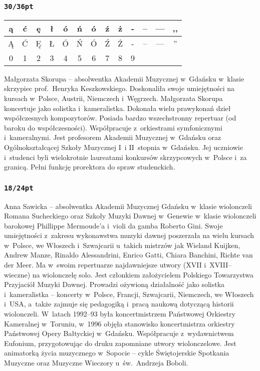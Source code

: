 \documentclass[twoside,a4page]{article}
\begin{document}
\subsubsection*{\tt 30/36pt}
\fontsize{30pt}{36pt}\selectfont

\begin{tabular}{|c|c|c|c|c|c|c|c|c|c|c|c|c|}\hline
ą & ć & ę & ł & ó & ń & ó & ź & ż & - &  -- &  --- &  ,, \\ \hline
Ą & Ć & Ę & Ł & Ó & Ń & Ó & Ź & Ż & - &  -- &  --- &  '' \\ \hline
0 & 1 & 2 & 3 & 4 & 5 & 6 & 7 & 8 & 9 &  & & \\ \hline
\end{tabular}

Małgorzata Skorupa – absolwentka Akademii Muzycznej w~Gdańsku w~klasie
skrzypiec prof.~Henryka Keszkowskiego. Doskonaliła swoje umiejętności
na kursach w~Polsce, Austrii, Niemczech i~Węgrzech. Małgorzata Skorupa
koncertuje jako solistka i~kameralistka. Dokonała wielu prawykonań
dzieł współczesnych kompozytorów. Posiada bardzo wszechstronny
repertuar (od baroku do współczesności). Współpracuje z~orkiestrami
symfonicznymi i~kameralnymi. Jest profesorem Akademii Muzycznej
w~Gdańsku oraz Ogólnokształcącej Szkoły Muzycznej I~i II~stopnia
w~Gdańsku. Jej uczniowie i~studenci byli wielokrotnie laureatami
konkursów skrzypcowych w~Polsce i~za granicą. Pełni funkcję prorektora
do spraw studenckich.

\subsubsection*{\tt 18/24pt}
\fontsize{24pt}{30pt}\selectfont

Anna Sawicka – absolwentka Akademii Muzycznej Gdańsku w~klasie
wiolonczeli Romana Sucheckiego oraz Szkoły Muzyki Dawnej w~Genewie
w~klasie wiolonczeli barokowej Phillippe Mermoude'a i~violi da gamba
Roberto Gini. Swoje umiejętności z~zakresu wykonawstwa muzyki dawnej
poszerzała na wielu kursach w~Polsce, we Włoszech i~Szwajcarii
u~takich mistrzów jak Wieland Kuijken, Andrew Manze, Rinaldo
Alessandrini, Enrico Gatti, Chiara Banchini, Richte van der Meer.
Ma w~swoim repertuarze najdawniejsze utwory (XVII i~XVIII–wieczne) na
wiolonczelę solo. Jest członkiem założycielem Polskiego Towarzystwa
Przyjaciół Muzyki Dawnej. Prowadzi ożywioną działalność jako solistka
i~kameralistka – koncerty w~Polsce, Francji, Szwajcarii, Niemczech, we
Włoszech i~USA, a~także zajmuje się pedagogiką i~pracą naukową
dotyczącą historii wiolonczeli. W~latach 1992–93 była
koncertmistrzem Państwowej Orkiestry Kameralnej w~Toruniu, w~1996
objęła stanowisko koncertmistrza orkiestry Państwowej Opery Bałtyckiej
w~Gdańsku. Współpracuje z~wydawnictwem Eufonium, przygotowując do
druku zapomniane utwory wiolonczelowe. Jest animatorką życia
muzycznego w~Sopocie – cykle Świętojerskie Spotkania Muzyczne
oraz Muzyczne Wieczory u~św.~Andrzeja Boboli.
\end{document}

